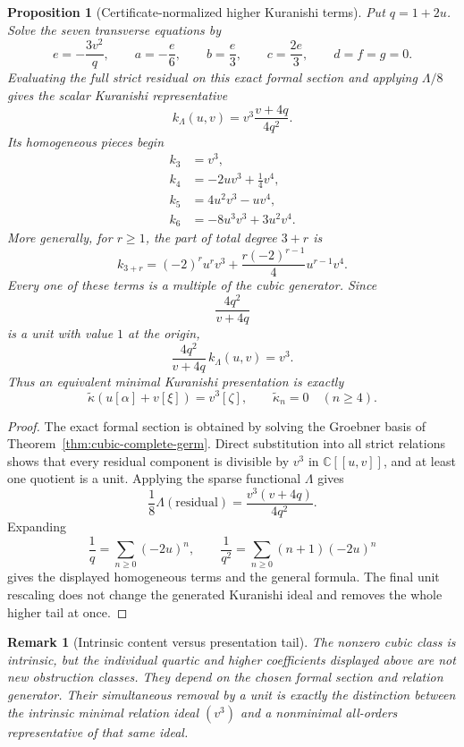 \documentclass[11pt]{amsart}
\newtheorem{proposition}[theorem]{Proposition}
\newtheorem{remark}[theorem]{Remark}
\newcommand{\C}{\mathbb C}
\begin{document}
\begin{proposition}[Certificate-normalized higher Kuranishi terms]\label{prop:cubic-higher-tail}
Put $q=1+2u$.  Solve the seven transverse equations by
\[
e=-\frac{3v^2}{q},
\qquad
a=-\frac e6,
\qquad b=\frac e3,
\qquad c=\frac{2e}{3},
\qquad d=f=g=0.
\]
Evaluating the full strict residual on this exact formal section and applying $\Lambda/8$ gives the scalar Kuranishi representative
\[
\boxed{
 k_\Lambda(u,v)
 =
 v^3\frac{v+4q}{4q^2}.
}
\]
Its homogeneous pieces begin
\begin{align*}
k_3&=v^3,\\
k_4&=-2uv^3+\frac14v^4,\\
k_5&=4u^2v^3-uv^4,\\
k_6&=-8u^3v^3+3u^2v^4.
\end{align*}
More generally, for $r\ge1$, the part of total degree $3+r$ is
\[
\boxed{
 k_{3+r}
 =
 (-2)^r u^r v^3
 +\frac{r(-2)^{r-1}}{4}u^{r-1}v^4.
}
\]
Every one of these terms is a multiple of the cubic generator.  Since
\[
\frac{4q^2}{v+4q}
\]
is a unit with value $1$ at the origin,
\[
\frac{4q^2}{v+4q}\,k_\Lambda(u,v)=v^3.
\]
Thus an equivalent minimal Kuranishi presentation is exactly
\[
\boxed{
\widetilde\kappa(u[\alpha]+v[\xi])=v^3[\zeta],
\qquad
\widetilde\kappa_n=0\quad(n\ge4).
}
\]
\end{proposition}

\begin{proof}
The exact formal section is obtained by solving the Groebner basis of Theorem~\ref{thm:cubic-complete-germ}.  Direct substitution into all strict relations shows that every residual component is divisible by $v^3$ in $\C[[u,v]]$, and at least one quotient is a unit.  Applying the sparse functional $\Lambda$ gives
\[
\frac18\Lambda(\text{residual})
=
\frac{v^3(v+4q)}{4q^2}.
\]
Expanding
\[
\frac1q=\sum_{n\ge0}(-2u)^n,
\qquad
\frac1{q^2}=\sum_{n\ge0}(n+1)(-2u)^n
\]
gives the displayed homogeneous terms and the general formula.  The final unit rescaling does not change the generated Kuranishi ideal and removes the whole higher tail at once.
\end{proof}

\begin{remark}[Intrinsic content versus presentation tail]
The nonzero cubic class is intrinsic, but the individual quartic and higher coefficients displayed above are not new obstruction classes.  They depend on the chosen formal section and relation generator.  Their simultaneous removal by a unit is exactly the distinction between the intrinsic minimal relation ideal $(v^3)$ and a nonminimal all-orders representative of that same ideal.
\end{remark}
\end{document}
